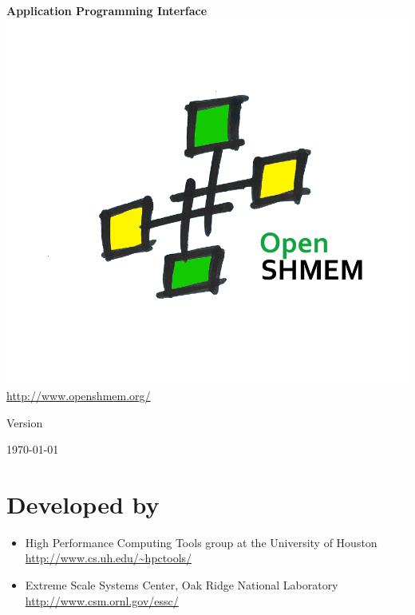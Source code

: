\thispagestyle{empty}
\begin{center}
\textbf{\Huge \openshmem}
\par
\end{center}

\begin{center}
\textbf{\LARGE Application Programming Interface}\\
\includegraphics[scale=0.65]{figures/OpenSHMEM_Pound}\\
\url{http://www.openshmem.org/}
\par
\end{center}

\begin{center}
Version \insertDocVersion
\par
\end{center}

\vspace{0.5in}
\begin{center}
\today
\end{center}

\vspace{0.5in}

\vfill{}

\section*{Developed by}
\begin{itemize}
\item High Performance Computing Tools group at the University of Houston\\
  \url{http://www.cs.uh.edu/~hpctools/} 
\item Extreme Scale Systems Center, Oak Ridge National Laboratory\\
  \url{http://www.csm.ornl.gov/essc/} 
\end{itemize}
\pagebreak{}

